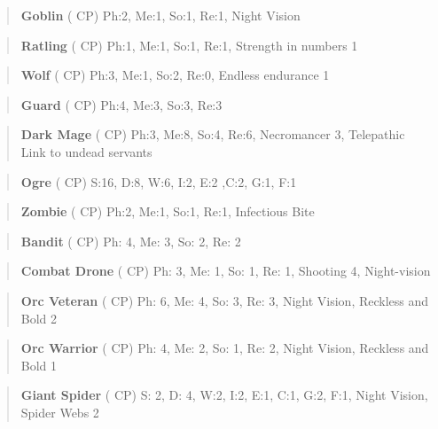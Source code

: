 \documentclass[11pt]{article}
\begin{document}
{\begin{quote}
\textbf{Goblin} ( CP)
Ph:2, Me:1, So:1, Re:1, Night Vision
\end{quote}

\begin{quote}
\textbf{Ratling} ( CP)
Ph:1, Me:1, So:1, Re:1, Strength in numbers 1
\end{quote}

\begin{quote}
\textbf{Wolf} ( CP)
Ph:3, Me:1, So:2, Re:0, Endless endurance 1
\end{quote}

\begin{quote}
\textbf{Guard} ( CP)
Ph:4, Me:3, So:3, Re:3
\end{quote}

\begin{quote}
\textbf{Dark Mage} ( CP)
Ph:3, Me:8, So:4, Re:6, Necromancer 3, Telepathic Link to undead servants
\end{quote}

\begin{quote}
\textbf{Ogre} ( CP)
S:16, D:8, W:6, I:2, E:2 ,C:2, G:1, F:1
\end{quote}

\begin{quote}
\textbf{Zombie} ( CP)
Ph:2, Me:1, So:1, Re:1, Infectious Bite
\end{quote}

\begin{quote}
\textbf{Bandit} ( CP)
Ph: 4, Me: 3, So: 2, Re: 2
\end{quote}

\begin{quote}
\textbf{Combat Drone} ( CP)
Ph: 3, Me: 1, So: 1, Re: 1, Shooting 4, Night-vision
\end{quote}

\begin{quote}
\textbf{Orc Veteran} ( CP)
Ph: 6, Me: 4, So: 3, Re: 3, Night Vision, Reckless and Bold 2
\end{quote}

\begin{quote}
\textbf{Orc Warrior} ( CP)
Ph: 4, Me: 2, So: 1, Re: 2, Night Vision, Reckless and Bold 1
\end{quote}

\begin{quote}
\textbf{Giant Spider} ( CP)
S: 2, D: 4, W:2, I:2, E:1, C:1, G:2, F:1, Night Vision, Spider Webs 2
\end{quote}


}
\end{document}
